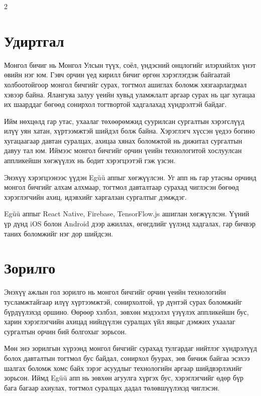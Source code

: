 \begin{multicols}{2}

\section*{Удиртгал}
Монгол бичиг нь Монгол Улсын түүх, соёл, үндэсний онцлогийг илэрхийлэх үнэт өвийн нэг юм. Гэвч орчин үед кирилл бичиг өргөн хэрэглэгдэж байгаатай холбоотойгоор монгол бичгийг сурах, тогтмол ашиглах боломж хязгаарлагдмал хэвээр байна. Ялангуяа залуу үеийн хувьд уламжлалт аргаар сурах нь цаг хугацаа их шаарддаг бөгөөд сонирхол тогтвортой хадгалахад хүндрэлтэй байдаг.

Ийм нөхцөлд гар утас, ухаалаг төхөөрөмжид суурилсан сургалтын хэрэгслүүд илүү уян хатан, хүртээмжтэй шийдэл болж байна. Хэрэглэгч хүссэн үедээ богино хугацаагаар давтан суралцах, ахицаа хянах боломжтой нь дижитал сургалтын давуу тал юм. Иймээс монгол бичгийг орчин үеийн технологитой хослуулсан аппликейшн хөгжүүлэх нь бодит хэрэгцээтэй гэж үзсэн.

Энэхүү хэрэгцээнээс үүдэн Egüü аппыг хөгжүүлсэн. Уг апп нь гар утасны орчинд монгол бичгийг алхам алхмаар, тогтмол давталтаар сурахад чиглэсэн бөгөөд хэрэглэгчийн ахиц, идэвхийг харгалзан сургалтыг дэмждэг.

Egüü аппыг React Native, Firebase, TensorFlow.js ашиглан хөгжүүлсэн. Үүний үр дүнд iOS болон Android дээр ажиллах, өгөгдлийг үүлэнд хадгалах, гар бичвэр таних боломжийг нэг дор шийдсэн.

\section*{Зорилго}
Энэхүү ажлын гол зорилго нь монгол бичгийг орчин үеийн технологийн тусламжтайгаар илүү хүртээмжтэй, сонирхолтой, үр дүнтэй сурах боломжийг бүрдүүлэхэд оршино. Өөрөөр хэлбэл, зөвхөн мэдээлэл үзүүлэх аппликейшн бус, харин хэрэглэгчийн ахицад нийцүүлэн суралцах үйл явцыг дэмжих ухаалаг сургалтын орчин бий болгохыг зорьсон.

Мөн энэ зорилгын хүрээнд монгол бичгийг сурахад тулгардаг нийтлэг хүндрэлүүд болох давталтын тогтмол бус байдал, сонирхол буурах, зөв бичиж байгаа эсэхээ шалгах боломж хомс байх зэрэг асуудлыг технологийн аргаар шийдвэрлэхийг зорьсон. Иймд Egüü апп нь зөвхөн агуулга хүргэх бус, хэрэглэгчийг өдөр бүр бага багаар ахиулах, тогтмол суралцах дадал төлөвшүүлэхэд чиглэсэн.


\end{multicols}
